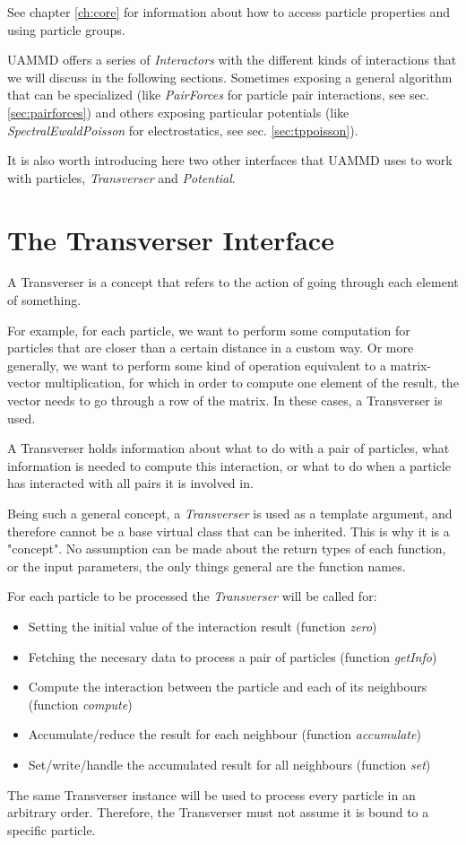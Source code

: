\documentclass[ twoside,openright,titlepage,numbers=noenddot,%
headinclude,footinclude,cleardoublepage=empty,abstract=on,
BCOR=5mm,paper=a4,fontsize=11pt, dvipsnames
]{scrreprt}
\newcommand{\uammd}{\gls{UAMMD}\xspace}
\begin{document}
See chapter \ref{ch:core} for information about how to access particle properties and using particle groups.

\uammd offers a series of \emph{Interactors} with the different kinds of interactions that we will discuss in the following sections. Sometimes exposing a general algorithm that can be specialized (like \emph{PairForces} for particle pair interactions, see sec. \ref{sec:pairforces}) and others exposing particular potentials (like \emph{SpectralEwaldPoisson} for electrostatics, see sec. \ref{sec:tppoisson}).

It is also worth introducing here two other interfaces that \uammd uses to work with particles, \emph{Transverser} and \emph{Potential}.

\section{The Transverser Interface} \label{sec:transverser}
A Transverser is a concept that refers to the action of going through each element of something.  

For example, for each particle, we want to perform some computation for particles that are closer than a certain distance in a custom way. Or more generally, we want to perform some kind of operation equivalent to a matrix-vector multiplication, for which in order to compute one element of the result, the vector needs to go through a row of the matrix.
In these cases, a Transverser is used.

A Transverser holds information about what to do with a pair of particles, what information is needed to compute this interaction, or what to do when a particle has interacted with all pairs it is involved in.  

Being such a general concept, a \emph{Transverser} is used as a template argument, and therefore cannot be a base virtual class that can be inherited. This is why it is a "concept". No assumption can be made about the return types of each function, or the input parameters, the only things general are the function names.  

For each particle to be processed the \emph{Transverser} will be called for:  
\begin{itemize}
\item Setting the initial value of the interaction result (function \emph{zero})
\item Fetching the necesary data to process a pair of particles  (function \emph{getInfo})
\item Compute the interaction between the particle  and each of its neighbours (function \emph{compute})
\item Accumulate/reduce  the result for each neighbour (function \emph{accumulate})
\item  Set/write/handle the accumulated result for all neighbours (function \emph{set})
 \end{itemize}
The same Transverser instance will be used to process every particle in an arbitrary order. Therefore, the Transverser must not assume it is bound to a specific particle.
\end{document}
